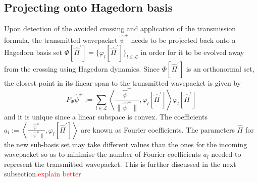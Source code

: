 \renewcommand{\baselinestretch}{1.5}
\usepackage{comment}
\usepackage[
backend=biber,
style=alphabetic,
sorting=ynt
]{biblatex}




%
%
%
%
%
%
%
%
%
%
%
%
\subsection{Projecting onto Hagedorn basis}
Upon detection of the avoided crossing and application of the transmission 
formula, the transmitted wavepacket $\hat{\psi}^{\mp}$ needs to be projected 
back onto a Hagedorn basis set $\Phi[\hat{\Pi}^\prime] =
\{\varphi_l[\hat{\Pi}^\prime]\}_{l \in \mathcal{L}}$ 
in order for it to be evolved away from the crossing using Hagedorn dynamics.  
Since $\Phi[\hat{\Pi}^\prime]$ is an orthonormal set,
the closest point in its linear span to the transmitted 
wavepacket is given by 
\begin{equation}
  P_{\Phi}\hat{\psi}^\mp := 
  \sum_{l \in \mathcal{L}} \left \langle \frac{\hat{\psi}^\mp}{\|\hat{\psi}^\mp \|} ,
  \varphi_l[\hat{\Pi}^\prime]  
  \right \rangle \varphi_l[\hat{\Pi}^\prime]
\end{equation}
and it is unique since a linear subspace is convex.
The coefficients 
$a_l := \left \langle \frac{\hat{\psi}^\mp}{\|\hat{\psi}^\mp \|} ,
\varphi_l[\hat{\Pi}^\prime] \right \rangle $
are known as Fourier coefficients.
The parameters $\hat{\Pi}$ for the new sub-basis set may take different 
values than the ones for the incoming wavepacket so as to minimise 
the number of Fourier coefficients $a_l$ needed to represent the 
transmitted wavepacket. This is further discussed in the next 
subsection.\textcolor{red}{explain better} 
%
%
%
%

